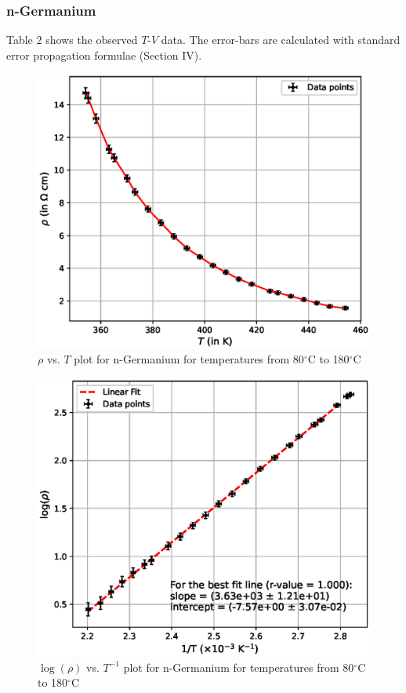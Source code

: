 \subsubsection{n-Germanium}

Table 2 shows the observed $T$-$V$ data. The error-bars are calculated with standard error propagation formulae (Section IV).
\begin{figure}[H]   
    \centering
    \includegraphics[width=1\columnwidth]{images/rho-ge.eps}
    \caption{$\rho$ vs. $T$ plot for n-Germanium for temperatures from 80$^\circ$C to 180$^\circ$C}
    \label{4.1}
\end{figure}
\begin{figure}[H]   
    \centering
    \includegraphics[width=1\columnwidth]{images/temp-ge.eps}
    \caption{$\log(\rho)$ vs. $T^{-1}$ plot for n-Germanium for temperatures from 80$^\circ$C to 180$^\circ$C}
    \label{4}
\end{figure}

